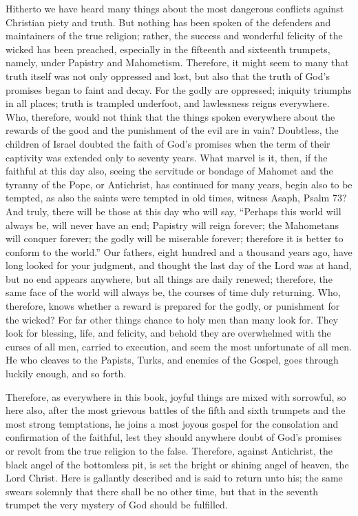 Hitherto we have heard many things about the most dangerous conflicts against Christian piety and truth. But nothing has been spoken of the defenders and maintainers of the true religion; rather, the success and wonderful felicity of the wicked has been preached, especially in the fifteenth and sixteenth trumpets, namely, under Papistry and Mahometism. Therefore, it might seem to many that truth itself was not only oppressed and lost, but also that the truth of God’s promises began to faint and decay. For the godly are oppressed; iniquity triumphs in all places; truth is trampled underfoot, and lawlessness reigns everywhere. Who, therefore, would not think that the things spoken everywhere about the rewards of the good and the punishment of the evil are in vain? Doubtless, the children of Israel doubted the faith of God’s promises when the term of their captivity was extended only to seventy years. What marvel is it, then, if the faithful at this day also, seeing the servitude or bondage of Mahomet and the tyranny of the Pope, or Antichrist, has continued for many years, begin also to be tempted, as also the saints were tempted in old times, witness Asaph, Psalm 73? And truly, there will be those at this day who will say, “Perhaps this world will always be, will never have an end; Papistry will reign forever; the Mahometans will conquer forever; the godly will be miserable forever; therefore it is better to conform to the world.” Our fathers, eight hundred and a thousand years ago, have long looked for your judgment, and thought the last day of the Lord was at hand, but no end appears anywhere, but all things are daily renewed; therefore, the same face of the world will always be, the courses of time duly returning. Who, therefore, knows whether a reward is prepared for the godly, or punishment for the wicked? For far other things chance to holy men than many look for. They look for blessing, life, and felicity, and behold they are overwhelmed with the curses of all men, carried to execution, and seem the most unfortunate of all men. He who cleaves to the Papists, Turks, and enemies of the Gospel, goes through luckily enough, and so forth.

Therefore, as everywhere in this book, joyful things are mixed with sorrowful, so here also, after the most grievous battles of the fifth and sixth trumpets and the most strong temptations, he joins a most joyous gospel for the consolation and confirmation of the faithful, lest they should anywhere doubt of God’s promises or revolt from the true religion to the false. Therefore, against Antichrist, the black angel of the bottomless pit, is set the bright or shining angel of heaven, the Lord Christ. Here is gallantly described and is said to return unto his; the same swears solemnly that there shall be no other time, but that in the seventh trumpet the very mystery of God should be fulfilled.

